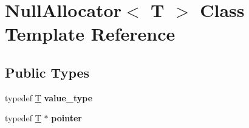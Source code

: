 \hypertarget{class_null_allocator}{}\section{Null\+Allocator$<$ T $>$ Class Template Reference}
\label{class_null_allocator}
\subsection*{Public Types}
\begin{DoxyCompactItemize}
\item 
\mbox{\label{class_null_allocator_abcee3f807b87bcd58c05690575355819}} 
typedef \mbox{\hyperlink{struct_t}{T}} {\bfseries value\+\_\+type}
\item 
\mbox{\label{class_null_allocator_ab9a145461924c369c220dfc2f3632945}} 
typedef \mbox{\hyperlink{struct_t}{T}} $\ast$ {\bfseries pointer}
\end{DoxyCompactItemize}
